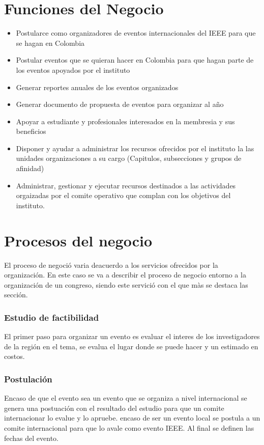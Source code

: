\newpage
\section{Funciones del Negocio}
\begin{itemize}
	\item Postularce como organizadores de eventos internacionales del IEEE para que se hagan en Colombia
	\item Postular eventos que se quieran hacer en Colombia para que hagan parte de los eventos apoyados por el instituto
	\item Generar reportes anuales de los eventos organizados
	\item Generar documento de propuesta de eventos para organizar al año
	\item Apoyar a estudiante y profesionales interesados en la membresia y sus beneficios
	\item Disponer y ayudar a administrar los recursos ofrecidos por el instituto la las unidades organizaciones a su cargo (Capitulos, subsecciones y grupos de afinidad)
	\item Administrar, gestionar y ejecutar recursos destinados a las actividades orgaizadas por el comite operativo que complan con los objetivos del instituto.
\end{itemize}
\newpage
\section{Procesos del negocio}
El proceso de negoció varia deacuerdo a los servicios ofrecidos por la organización. En este caso se va a describir el proceso de negocio entorno a la organización de un congreso, siendo este servició con el que màs se destaca las sección.

\subsubsection{Estudio de factibilidad}
El primer paso para organizar un evento es evaluar el interes de los investigadores de la región en el tema, se evalua el lugar donde se puede hacer y un estimado en costos.

\subsubsection{Postulación}
Encaso de que el evento sea un evento que se organiza a nivel internacional se genera una postuación con el resultado del estudio para que un comite internacionar lo evalue y lo apruebe. encaso de ser un evento local se postula a un comite internacional para que lo avale como evento IEEE. Al final se definen las fechas del evento. 

